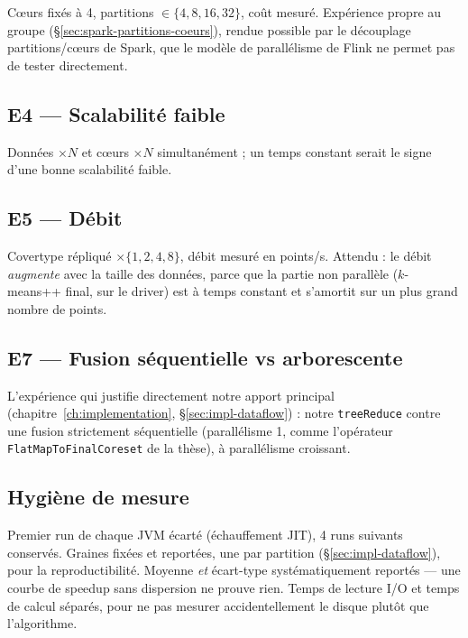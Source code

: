 C\oe{}urs fixés à 4, partitions $\in \{4,8,16,32\}$, coût mesuré. Expérience
propre au groupe (§\ref{sec:spark-partitions-coeurs}), rendue possible par
le découplage partitions/c\oe{}urs de Spark, que le modèle de parallélisme de
Flink ne permet pas de tester directement.


\subsection{E4 --- Scalabilité faible}

Données $\times N$ et c\oe{}urs $\times N$ simultanément ; un temps constant
serait le signe d'une bonne scalabilité faible.


\subsection{E5 --- Débit}

Covertype répliqué $\times\{1,2,4,8\}$, débit mesuré en points/s. Attendu :
le débit \emph{augmente} avec la taille des données, parce que la partie
non parallèle ($k$-means++ final, sur le driver) est à temps constant et
s'amortit sur un plus grand nombre de points.


\subsection{E7 --- Fusion séquentielle vs arborescente}

L'expérience qui justifie directement notre apport principal
(chapitre~\ref{ch:implementation}, §\ref{sec:impl-dataflow}) : notre
\texttt{treeReduce} contre une fusion strictement séquentielle (parallélisme
1, comme l'opérateur \texttt{FlatMapToFinalCoreset} de la thèse), à
parallélisme croissant.


\subsection{Hygiène de mesure}

Premier run de chaque JVM écarté (échauffement JIT), 4 runs suivants
conservés. Graines fixées et reportées, une par partition
(§\ref{sec:impl-dataflow}), pour la reproductibilité. Moyenne \emph{et}
écart-type systématiquement reportés --- une courbe de speedup sans
dispersion ne prouve rien. Temps de lecture I/O et temps de calcul séparés,
pour ne pas mesurer accidentellement le disque plutôt que l'algorithme.
